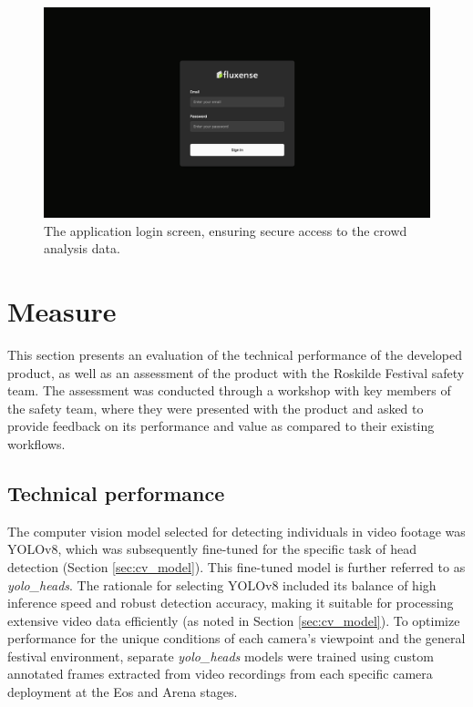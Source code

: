 \begin{figure}[H]
  \centering
  \includegraphics[width=\textwidth]{Pictures/Misc/Frontend/login.png}
  \caption{The application login screen, ensuring secure access to the crowd analysis data.}
  \label{fig:showcase:login}

\end{figure}

\section{Measure}
This section presents an evaluation of the technical performance of the developed product, as well as an assessment of the product with the Roskilde Festival safety team. The assessment was conducted through a workshop with key members of the safety team, where they were presented with the product and asked to provide feedback on its performance and value as compared to their existing workflows.


\subsection{Technical performance}
\label{sec:technical-performance}

The computer vision model selected for detecting individuals in video footage was YOLOv8, which was subsequently fine-tuned for the specific task of head detection (Section \ref{sec:cv_model}). This fine-tuned model is further referred to as \textit{yolo\_heads}. The rationale for selecting YOLOv8 included its balance of high inference speed and robust detection accuracy, making it suitable for processing extensive video data efficiently (as noted in Section \ref{sec:cv_model}). To optimize performance for the unique conditions of each camera's viewpoint and the general festival environment, separate \textit{yolo\_heads} models were trained using custom annotated frames extracted from video recordings from each specific camera deployment at the Eos and Arena stages.

